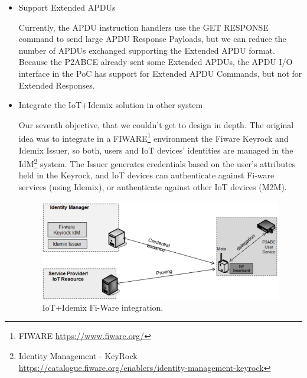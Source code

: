 \begin{itemize}
	
	\item Support Extended APDUs
	
	Currently, the APDU instruction handlers use the GET RESPONSE command to send large APDU Response Payloads, but we can reduce the number of APDUs exchanged supporting the Extended APDU format. Because the P2ABCE already sent some Extended APDUs, the APDU I/O interface in the PoC has support for Extended APDU Commands, but not for Extended Responses.
	
	\item Integrate the IoT+Idemix solution in other system
	
	Our seventh objective, that we couldn't get to design in depth. The original idea was to integrate in a FIWARE\footnote{FIWARE \url{https://www.fiware.org/}} environment the Fiware Keyrock and Idemix Issuer, so both, users and IoT devices' identities are managed in the IdM\footnote{Identity Management - KeyRock \url{https://catalogue.fiware.org/enablers/identity-management-keyrock}} system. The Issuer generates credentials based on the user’s attributes held in the Keyrock, and IoT devices can authenticate against Fi-ware services (using Idemix), or authenticate against other IoT devices (M2M).
	
	
	\begin{figure}[bth]
		\begin{center}
			\includegraphics[width=0.8\linewidth]{gfx/fiware}
		\end{center}
		\caption{IoT+Idemix Fi-Ware integration.}
		\label{fig:fiware}
	\end{figure}
	
\end{itemize}







